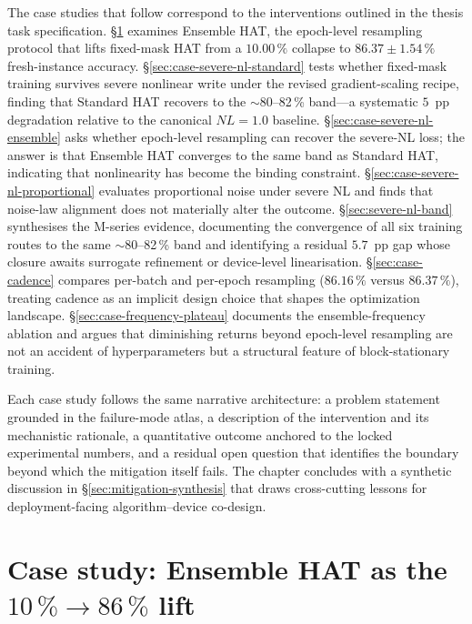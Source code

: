 The case studies that follow correspond to the interventions outlined in the thesis task specification. \S\ref{sec:case-ensemble-hat} examines Ensemble HAT, the epoch-level resampling protocol that lifts fixed-mask HAT from a $10.00\,\%$ collapse to $86.37\pm1.54\,\%$ fresh-instance accuracy. \S\ref{sec:case-severe-nl-standard} tests whether fixed-mask training survives severe nonlinear write under the revised gradient-scaling recipe, finding that Standard HAT recovers to the $\sim$80--82\,\% band---a systematic $5$~pp degradation relative to the canonical $NL=1.0$ baseline. \S\ref{sec:case-severe-nl-ensemble} asks whether epoch-level resampling can recover the severe-NL loss; the answer is that Ensemble HAT converges to the same band as Standard HAT, indicating that nonlinearity has become the binding constraint. \S\ref{sec:case-severe-nl-proportional} evaluates proportional noise under severe NL and finds that noise-law alignment does not materially alter the outcome. \S\ref{sec:severe-nl-band} synthesises the M-series evidence, documenting the convergence of all six training routes to the same $\sim$80--82\,\% band and identifying a residual $5.7$~pp gap whose closure awaits surrogate refinement or device-level linearisation. \S\ref{sec:case-cadence} compares per-batch and per-epoch resampling ($86.16\,\%$ versus $86.37\,\%$), treating cadence as an implicit design choice that shapes the optimization landscape. \S\ref{sec:case-frequency-plateau} documents the ensemble-frequency ablation and argues that diminishing returns beyond epoch-level resampling are not an accident of hyperparameters but a structural feature of block-stationary training.

Each case study follows the same narrative architecture: a problem statement grounded in the failure-mode atlas, a description of the intervention and its mechanistic rationale, a quantitative outcome anchored to the locked experimental numbers, and a residual open question that identifies the boundary beyond which the mitigation itself fails. The chapter concludes with a synthetic discussion in \S\ref{sec:mitigation-synthesis} that draws cross-cutting lessons for deployment-facing algorithm--device co-design.


\section{Case study: Ensemble HAT as the \texorpdfstring{$10\,\%\rightarrow86\,\%$}{10\,\%→86\,\%} lift}
\label{sec:case-ensemble-hat}

